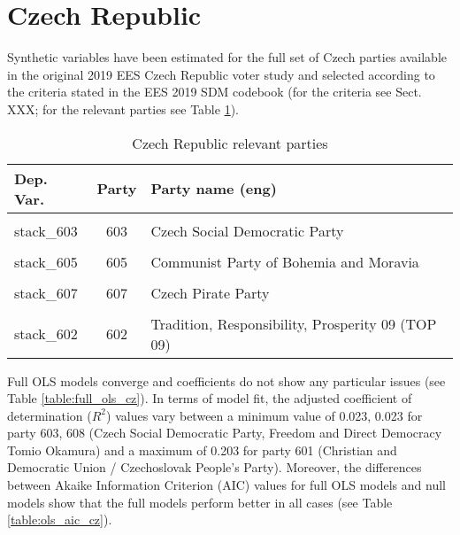 \documentclass[
]{article}
\begin{document}
\newpage

\hypertarget{czech-republic}{%
\section{Czech Republic}\label{czech-republic}}

Synthetic variables have been estimated for the full set of Czech parties available in the original
2019 EES Czech Republic voter study and selected according to the criteria stated in the EES 2019 SDM codebook (for the criteria see Sect. XXX; for the relevant parties see Table \ref{table:relprty_tab_cz}).

\begin{table}[!h]

\caption{\label{tab:unnamed-chunk-24}Czech Republic relevant parties \label{table:relprty_tab_cz}}
\centering
\begin{tabular}[t]{lcl}
\toprule
Dep. Var. & Party & Party name (eng)\\
\midrule
\cellcolor{gray!6}{stack\_601} & \cellcolor{gray!6}{601} & \cellcolor{gray!6}{Christian and Democratic Union / Czechoslovak People's Party}\\
stack\_603 & 603 & Czech Social Democratic Party\\
\cellcolor{gray!6}{stack\_604} & \cellcolor{gray!6}{604} & \cellcolor{gray!6}{Civic Democratic Party}\\
stack\_605 & 605 & Communist Party of Bohemia and Moravia\\
\cellcolor{gray!6}{stack\_606} & \cellcolor{gray!6}{606} & \cellcolor{gray!6}{ANO 2011}\\
\addlinespace
stack\_607 & 607 & Czech Pirate Party\\
\cellcolor{gray!6}{stack\_608} & \cellcolor{gray!6}{608} & \cellcolor{gray!6}{Freedom and Direct Democracy Tomio Okamura}\\
stack\_602 & 602 & Tradition, Responsibility, Prosperity 09 (TOP 09)\\
\bottomrule
\end{tabular}
\end{table}

Full OLS models converge and coefficients do not show any particular issues (see Table
\ref{table:full_ols_cz}).
In terms of model fit, the adjusted coefficient of determination (\(R^2\)) values vary between
a minimum value of 0.023, 0.023
for party 603, 608
(Czech Social Democratic Party, Freedom and Direct Democracy Tomio Okamura)
and a maximum of 0.203
for party 601
(Christian and Democratic Union / Czechoslovak People's Party).
Moreover, the differences between Akaike Information Criterion (AIC) values for full OLS models and null
models show that the full models perform better in all cases (see Table \ref{table:ols_aic_cz}).
\end{document}

